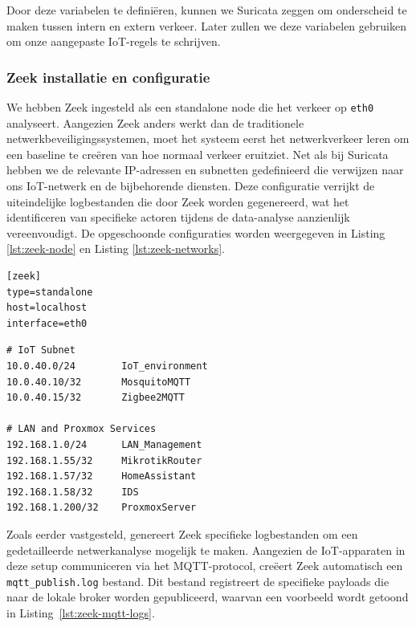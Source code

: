 Door deze variabelen te definiëren, kunnen we Suricata zeggen om onderscheid te maken tussen intern en extern verkeer. Later zullen we deze variabelen gebruiken om onze aangepaste IoT-regels te schrijven.

\subsubsection{Zeek installatie en configuratie}


We hebben Zeek ingesteld als een standalone node die het verkeer op \texttt{eth0} analyseert. Aangezien Zeek anders werkt dan de traditionele netwerkbeveiligingssystemen, moet het systeem eerst het netwerkverkeer leren om een baseline te creëren van hoe normaal verkeer eruitziet. Net als bij Suricata hebben we de relevante IP-adressen en subnetten gedefinieerd die verwijzen naar ons IoT-netwerk en de bijbehorende diensten. Deze configuratie verrijkt de uiteindelijke logbestanden die door Zeek worden gegenereerd, wat het identificeren van specifieke actoren tijdens de data-analyse aanzienlijk vereenvoudigt. De opgeschoonde configuraties worden weergegeven in Listing \ref{lst:zeek-node} en Listing \ref{lst:zeek-networks}.


\begin{listing}[H]
\begin{verbatim}
[zeek]
type=standalone
host=localhost
interface=eth0
\end{verbatim}
\caption{Interface- en modusconfiguratie van Zeek in \texttt{node.cfg}.}
\label{lst:zeek-node}
\end{listing}

\begin{listing}[H]
\begin{verbatim}
# IoT Subnet
10.0.40.0/24        IoT_environment
10.0.40.10/32       MosquitoMQTT
10.0.40.15/32       Zigbee2MQTT

# LAN and Proxmox Services
192.168.1.0/24      LAN_Management
192.168.1.55/32     MikrotikRouter
192.168.1.57/32     HomeAssistant
192.168.1.58/32     IDS
192.168.1.200/32    ProxmoxServer
\end{verbatim}
\caption{Definitie van netwerksegmenten en hosts in \texttt{networks.cfg}.}
\label{lst:zeek-networks}
\end{listing}



Zoals eerder vastgesteld, genereert Zeek specifieke logbestanden om een gedetailleerde netwerkanalyse mogelijk te maken. Aangezien de IoT-apparaten in deze setup communiceren via het MQTT-protocol, creëert Zeek automatisch een \texttt{mqtt\_publish.log} bestand. Dit bestand registreert de specifieke payloads die naar de lokale broker worden gepubliceerd, waarvan een voorbeeld wordt getoond in Listing~\ref{lst:zeek-mqtt-logs}.


